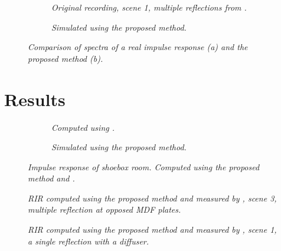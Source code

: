\documentclass[twoside,a4paper]{article}
\begin{document}
\begin{figure}[ht]
    \center
    \begin{subfigure}[t]{0.45\textwidth}
      \centering
      
      \caption{\label{fig:fig:multReflSpecOrig} \it Original recording, scene 1, multiple reflections from \cite{brinkmann_round_2019}. }
    \end{subfigure}%
    \begin{subfigure}[t]{0.45\textwidth}
      \centering
      
      \caption{\label{fig:multReflSpecSim} \it Simulated using the proposed method. }
    \end{subfigure}
    \caption{\it Comparison of spectra of a real impulse response (a) and the proposed method (b).}
    \label{fig:multReflSpecCompare}
\end{figure}


\section{Results}

\begin{figure}[ht]
    \center
    \begin{subfigure}[t]{0.45\textwidth}
      \centering
      
    \caption{\label{fig:shoeA} \it Computed using \cite{lehmann_fast_2020}. }
    \end{subfigure}%
    \begin{subfigure}[t]{0.45\textwidth}
      \centering
      
      \caption{\label{fig:shoeB} \it Simulated using the proposed method. }
    \end{subfigure}
    \caption{\it Impulse response of shoebox room. Computed using the proposed method and \cite{lehmann_fast_2020}.}
    \label{fig:showSpecs}
\end{figure}


\begin{figure}

    \begin{center}
      
    \end{center}
    
    \caption{\label{fig:multRefl} \it RIR computed using the proposed method and measured by \cite{brinkmann_round_2019}, scene 3, multiple reflection at opposed MDF plates.}
\end{figure}

\begin{figure}
    \begin{center}
      
    \end{center}
    
    \caption{\label{fig:diffuser} \it RIR computed using the proposed method and measured by \cite{brinkmann_round_2019}, scene 1, a single reflection with a diffuser.}
\end{figure}
\end{document}
